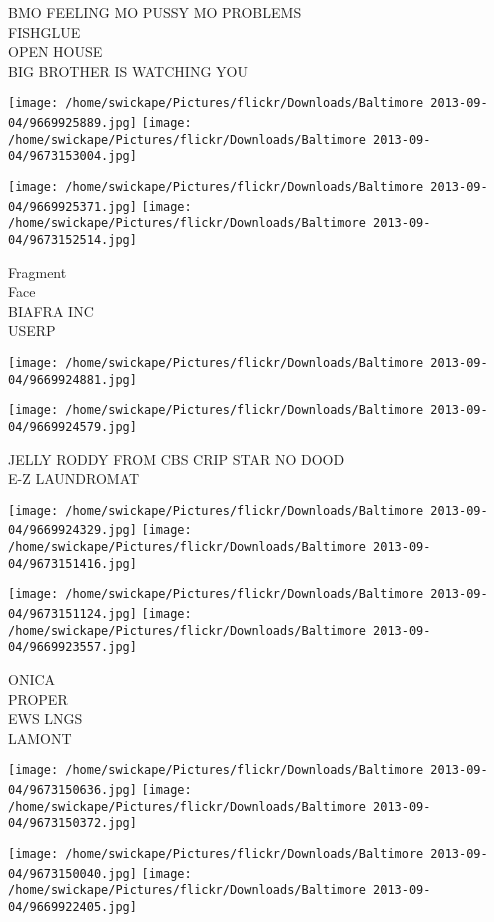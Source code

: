 \documentclass[10pt,letterpaper]{article}
\begin{document}
BMO FEELING MO PUSSY MO PROBLEMS\\
FISHGLUE\\
OPEN HOUSE\\
BIG BROTHER IS WATCHING YOU
\pagebreak

\texttt{[image: /home/swickape/Pictures/flickr/Downloads/Baltimore 2013-09-04/9669925889.jpg]}
\texttt{[image: /home/swickape/Pictures/flickr/Downloads/Baltimore 2013-09-04/9673153004.jpg]}

\texttt{[image: /home/swickape/Pictures/flickr/Downloads/Baltimore 2013-09-04/9669925371.jpg]}
\texttt{[image: /home/swickape/Pictures/flickr/Downloads/Baltimore 2013-09-04/9673152514.jpg]}

Fragment\\
Face\\
BIAFRA INC\\
USERP
\pagebreak

\texttt{[image: /home/swickape/Pictures/flickr/Downloads/Baltimore 2013-09-04/9669924881.jpg]}

\vspace{0.25in}
\texttt{[image: /home/swickape/Pictures/flickr/Downloads/Baltimore 2013-09-04/9669924579.jpg]}

JELLY RODDY FROM CBS CRIP STAR NO DOOD\\
E{-}Z LAUNDROMAT
\pagebreak

\texttt{[image: /home/swickape/Pictures/flickr/Downloads/Baltimore 2013-09-04/9669924329.jpg]}
\texttt{[image: /home/swickape/Pictures/flickr/Downloads/Baltimore 2013-09-04/9673151416.jpg]}

\texttt{[image: /home/swickape/Pictures/flickr/Downloads/Baltimore 2013-09-04/9673151124.jpg]}
\texttt{[image: /home/swickape/Pictures/flickr/Downloads/Baltimore 2013-09-04/9669923557.jpg]}

ONICA\\
PROPER\\
EWS LNGS\\
LAMONT
\pagebreak

\texttt{[image: /home/swickape/Pictures/flickr/Downloads/Baltimore 2013-09-04/9673150636.jpg]}
\texttt{[image: /home/swickape/Pictures/flickr/Downloads/Baltimore 2013-09-04/9673150372.jpg]}

\texttt{[image: /home/swickape/Pictures/flickr/Downloads/Baltimore 2013-09-04/9673150040.jpg]}
\texttt{[image: /home/swickape/Pictures/flickr/Downloads/Baltimore 2013-09-04/9669922405.jpg]}
\end{document}

